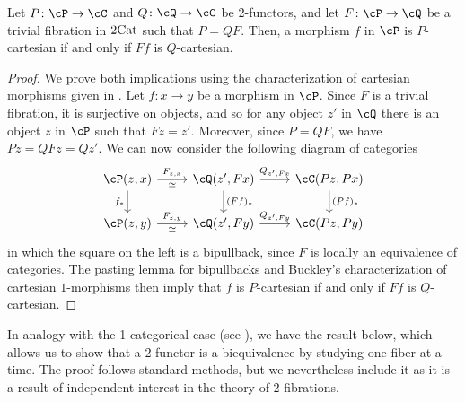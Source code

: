 \documentclass[11pt, dvipsnames]{amsart}
\begin{document}
        \begin{lem}\label{lem:trivialLackfibs_and_cartesians}
			Let $P\colon\cP \to \cC$ and $Q\colon\cQ \to \cC$ be 2-functors, and let $F\colon \cP \to \cQ$ be a trivial fibration in $2\mathrm{Cat}$ such that $P=QF$. Then, a morphism $f$ in $\cP$ is $P$-cartesian if and only if $Ff$ is $Q$-cartesian.
		\end{lem}
		\begin{proof}
			We prove both implications using the characterization of cartesian morphisms given in \cite[Proposition 3.1.2]{Buckley2014}. Let $f\colon x\to y$ be a morphism in $\cP$. Since $F$ is a trivial fibration, it is surjective on objects, and so for any object $z'$ in $\cQ$ there is an object $z$ in $\cP$ such that $Fz = z'$. Moreover, since $P=QF$, we have $Pz = QFz = Qz'$. We can now consider the following diagram of categories 
            \[\begin{tikzcd}
{\cP(z,x)}\rar["F_{z,x}","\simeq"']\dar["f_*"'] & {\cQ(z',Fx)}\rar["Q_{z',Fx}"]\dar["(Ff)_*"] & {\cC(Pz,Px)}\dar["(Pf)_*"]\\
			{\cP(z,y)}\rar["F_{z,y}","\simeq"'] & {\cQ(z', Fy)}\rar["Q_{z',Fy}"] & {\cC(Pz,Py)}
            \end{tikzcd}\]
			in which the square on the left is a bipullback, since $F$ is locally an equivalence of categories. The pasting lemma for bipullbacks \cite[Lemma 1.2.24]{maillard:tel-03475256} and Buckley's characterization of cartesian $1$-morphisms \cite[Proposition 3.1.2]{Buckley2014} then imply that $f$ is $P$-cartesian if and only if $Ff$ is $Q$-cartesian.
		\end{proof}

In analogy with the 1-categorical case (see \cite[\nopp Proposition 3.36]{vistoli2007notesgrothendiecktopologiesfibered}), we have the result below, which allows us to show that a 2-functor is a biequivalence by studying one fiber at a time. The proof follows standard methods, but we nevertheless include it as it is a result of independent interest in the theory of 2-fibrations.
\end{document}
